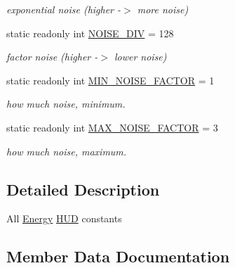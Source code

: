 \begin{DoxyCompactItemize}
\begin{DoxyCompactList}\small\item\em exponential noise (higher -\/$>$ more noise) \end{DoxyCompactList}\item 
static readonly int \hyperlink{classClient_1_1Common_1_1Constants_1_1HUD_1_1Energy_a82587d17d69f23eebb8f995dec7d873e}{N\+O\+I\+S\+E\+\_\+\+D\+I\+V} = 128
\begin{DoxyCompactList}\small\item\em factor noise (higher -\/$>$ lower noise) \end{DoxyCompactList}\item 
static readonly int \hyperlink{classClient_1_1Common_1_1Constants_1_1HUD_1_1Energy_ab7aaf06c6379be774b2709f67277b903}{M\+I\+N\+\_\+\+N\+O\+I\+S\+E\+\_\+\+F\+A\+C\+T\+O\+R} = 1
\begin{DoxyCompactList}\small\item\em how much noise, minimum. \end{DoxyCompactList}\item 
static readonly int \hyperlink{classClient_1_1Common_1_1Constants_1_1HUD_1_1Energy_a4342e8edca802497bdd5a82e58e04697}{M\+A\+X\+\_\+\+N\+O\+I\+S\+E\+\_\+\+F\+A\+C\+T\+O\+R} = 3
\begin{DoxyCompactList}\small\item\em how much noise, maximum. \end{DoxyCompactList}\end{DoxyCompactItemize}


\subsection{Detailed Description}
All \hyperlink{classClient_1_1Common_1_1Constants_1_1HUD_1_1Energy}{Energy} \hyperlink{namespaceClient_1_1Common_1_1Constants_1_1HUD}{H\+U\+D} constants 



\subsection{Member Data Documentation}
\hypertarget{classClient_1_1Common_1_1Constants_1_1HUD_1_1Energy_a76f90c964a89ef1b996a17137a3d6518}{}
